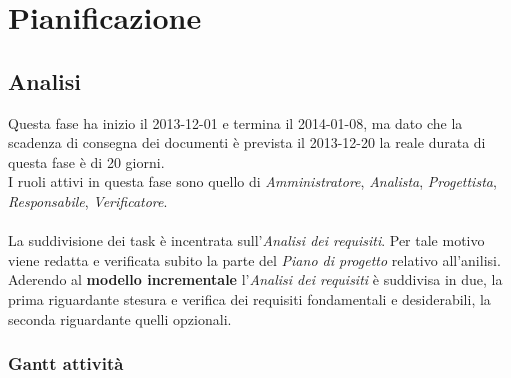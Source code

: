 \section{Pianificazione}
	\subsection{Analisi}

Questa fase ha inizio il 2013-12-01 e termina il 2014-01-08, ma dato che la scadenza di consegna dei documenti è prevista il 2013-12-20 la reale durata di questa fase è di 20 giorni. \\
I ruoli attivi in questa fase sono quello di \textit{Amministratore}, \textit{Analista}, \textit{Progettista}, \textit{Responsabile}, \textit{Verificatore}. \\ \\
La suddivisione dei task è incentrata sull'\textit{Analisi dei requisiti}. Per tale motivo viene redatta e verificata subito la parte del \textit{Piano di progetto} relativo all'anilisi.
Aderendo al \textbf{modello incrementale} l'\textit{Analisi dei requisiti} è suddivisa in due, la prima riguardante stesura e verifica dei requisiti fondamentali e desiderabili, la seconda riguardante quelli opzionali.
\subsubsection{Gantt attività}

